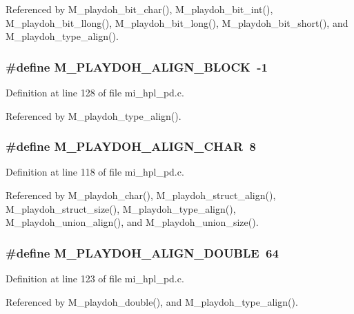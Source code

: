 Referenced by M\_\-playdoh\_\-bit\_\-char(), M\_\-playdoh\_\-bit\_\-int(), M\_\-playdoh\_\-bit\_\-llong(), M\_\-playdoh\_\-bit\_\-long(), M\_\-playdoh\_\-bit\_\-short(), and M\_\-playdoh\_\-type\_\-align().
\subsubsection{\setlength{\rightskip}{0pt plus 5cm}\#define M\_\-PLAYDOH\_\-ALIGN\_\-BLOCK~-1}\label{mi__hpl__pd_8c_3d05220b1d37b2503453ff94d82c54b4}




Definition at line 128 of file mi\_\-hpl\_\-pd.c.

Referenced by M\_\-playdoh\_\-type\_\-align().
\subsubsection{\setlength{\rightskip}{0pt plus 5cm}\#define M\_\-PLAYDOH\_\-ALIGN\_\-CHAR~8}\label{mi__hpl__pd_8c_38547657aede2b6658514d361b62eaa7}




Definition at line 118 of file mi\_\-hpl\_\-pd.c.

Referenced by M\_\-playdoh\_\-char(), M\_\-playdoh\_\-struct\_\-align(), M\_\-playdoh\_\-struct\_\-size(), M\_\-playdoh\_\-type\_\-align(), M\_\-playdoh\_\-union\_\-align(), and M\_\-playdoh\_\-union\_\-size().
\subsubsection{\setlength{\rightskip}{0pt plus 5cm}\#define M\_\-PLAYDOH\_\-ALIGN\_\-DOUBLE~64}\label{mi__hpl__pd_8c_01269740306673bfebab02b790c8427f}




Definition at line 123 of file mi\_\-hpl\_\-pd.c.

Referenced by M\_\-playdoh\_\-double(), and M\_\-playdoh\_\-type\_\-align().

